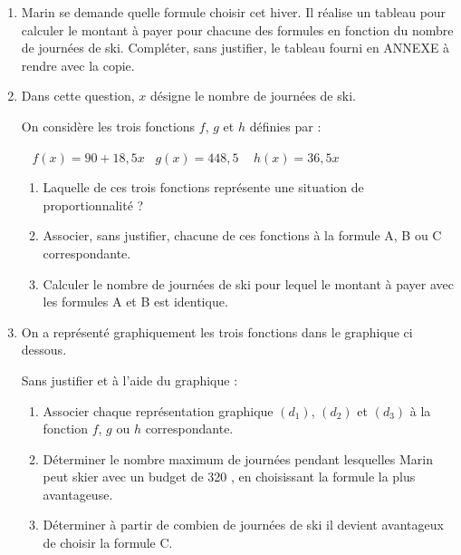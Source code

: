\documentclass[11pt]{article}
\newcommand{\euro}{\eurologo{}}
\begin{document}
\begin{enumerate}
	\item Marin se demande quelle formule choisir cet hiver. Il réalise un tableau pour calculer le montant à payer pour chacune des formules en fonction du nombre de journées de ski. Compléter, sans justifier, le tableau fourni en ANNEXE à rendre avec la copie.
	
	\item Dans cette question, $x$ désigne le nombre de journées de ski.
	
	On considère les trois fonctions $f$, $g$ et $h$ définies par :
	
	\hfill~ $f(x) = 90 + 18,5x$\hfill~ $g(x) = 448,5$ \hfill~ $	h(x) = 36,5x$\hfill~
	
	\begin{enumerate}
		\item Laquelle de ces trois fonctions représente une situation de proportionnalité ?
		
		\item Associer, sans justifier, chacune de ces fonctions à la formule A, B ou C correspondante.
		
		\item Calculer le nombre de journées de ski pour lequel le montant à payer avec les formules A et B est identique.
	\end{enumerate}

	\item On a représenté graphiquement les trois fonctions dans le graphique ci dessous.
	
	Sans justifier et à l'aide du graphique :
	
	\begin{enumerate}
		\item Associer chaque représentation graphique $(d_1)$, $(d_2)$ et $(d_3)$ à la fonction $f$, $g$ ou $h$ correspondante.
		
		\item Déterminer le nombre maximum de journées pendant lesquelles Marin peut skier avec un budget de 320 \euro{}, en choisissant la formule la plus avantageuse.
		
		\item Déterminer à partir de combien de journées de ski il devient avantageux de choisir la formule C.
	\end{enumerate}
\end{enumerate}
\end{document}

